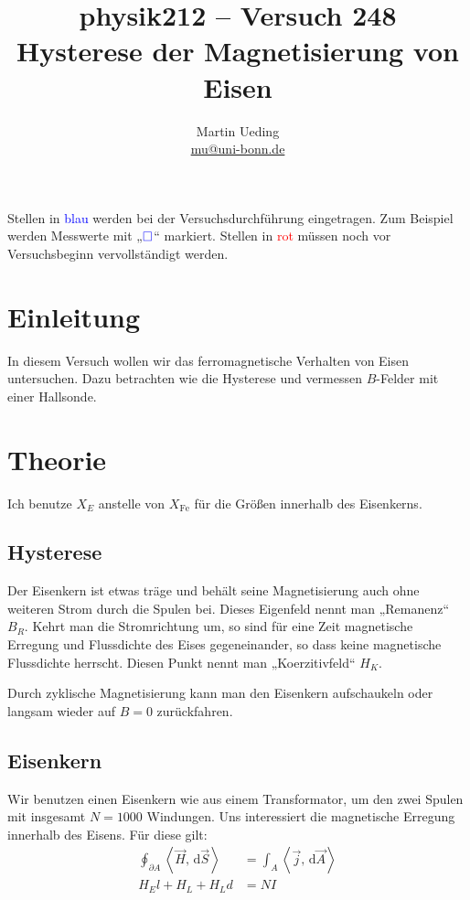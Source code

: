 \documentclass[11pt, ngerman]{article}
\title{physik212 – Versuch 248 \\ Hysterese der Magnetisierung von Eisen}
\author{Martin Ueding \\ {\small \href{mailto:mu@uni-bonn.de}{mu@uni-bonn.de}}}
\newcommand{\messwert}{\textcolor{blue}{\square}}
\renewcommand{\d}{\, \mathrm d}
\begin{document}
\maketitle

\tableofcontents

\vfill

\begin{small}
	Stellen in \textcolor{blue}{blau} werden bei der Versuchsdurchführung
	eingetragen. Zum Beispiel werden Messwerte mit „$\messwert$“ markiert.
	Stellen in \textcolor{red}{rot} müssen noch vor Versuchsbeginn
	vervollständigt werden.
\end{small}

\newpage

\section{Einleitung}

In diesem Versuch wollen wir das ferromagnetische Verhalten von Eisen
untersuchen. Dazu betrachten wie die Hysterese und vermessen $B$-Felder mit
einer Hallsonde.

\section{Theorie}

Ich benutze $X_E$ anstelle von $X_\text{Fe}$ für die Größen innerhalb des
Eisenkerns.

\subsection{Hysterese}

Der Eisenkern ist etwas träge und behält seine Magnetisierung auch ohne
weiteren Strom durch die Spulen bei. Dieses Eigenfeld nennt man „Remanenz“
$B_R$. Kehrt man die Stromrichtung um, so sind für eine Zeit magnetische
Erregung und Flussdichte des Eises gegeneinander, so dass keine magnetische
Flussdichte herrscht. Diesen Punkt nennt man „Koerzitivfeld“ $H_K$.

Durch zyklische Magnetisierung kann man den Eisenkern aufschaukeln oder langsam
wieder auf $B=0$ zurückfahren.

\subsection{Eisenkern}

Wir benutzen einen Eisenkern wie aus einem Transformator, um den zwei Spulen mit insgesamt $N = 1000$ Windungen. Uns interessiert die magnetische Erregung innerhalb des Eisens. Für diese gilt:
%
\begin{align*}
	\oint_{\partial A} \left\langle \vec H, \d \vec S \right\rangle
	&= \int_A \left\langle \vec j, \d \vec A \right\rangle \\
	H_E l + H_L + H_L d &= N I
\end{align*}
\end{document}
